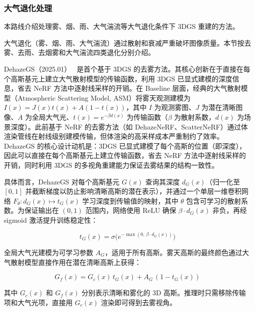 \subsubsection{大气退化处理}

本路线介绍处理雾、烟、雨、大气湍流等大气退化条件下 3DGS 重建的方法。

大气退化（雾、烟、雨、大气湍流）通过散射和衰减严重破坏图像质量。本节按去雾、去雨、去烟雾和大气湍流四类退化分别介绍。

DehazeGS（2025.01）~\cite{2501_03659} 是首个基于 3DGS 的去雾方法。其核心创新在于直接在每个高斯基元上建立大气散射模型的传输函数，利用 3DGS 已显式建模的深度信息，省去 NeRF 方法中逐射线采样的开销。在 Baseline 层面，经典的大气散射模型（Atmospheric Scattering Model, ASM）将雾天观测建模为 $I(x) = J(x)t(x) + A(1-t(x))$，其中 $I$ 为观测雾图、$J$ 为潜在清晰图像、$A$ 为全局大气光、$t(x) = e^{-\beta d(x)}$ 为传输函数（$\beta$ 为散射系数，$d(x)$ 为场景深度）。此前基于 NeRF 的去雾方法（如 DehazeNeRF、ScatterNeRF）通过体渲染管线在射线级别建模传输，但体渲染的高采样成本严重制约了效率。DehazeGS 的核心设计动机是：3DGS 已显式建模了每个高斯的位置（即深度），因此可以直接在每个高斯基元上建立传输函数，省去 NeRF 方法中逐射线采样的开销，同时利用 3DGS 的多视角重建能力保证去雾结果的结构一致性。

具体而言，DehazeGS 对每个高斯基元 $G(x)$ 查询其深度 $d_G(x)$（归一化至 $[0,1]$ 并截断梯度以防止影响清晰高斯的潜在表示），并通过一个单层一维卷积网络 $F_\theta: d_G(x) \mapsto t_G(x)$ 学习深度到传输值的映射，其中 $\theta$ 包含可学习的散射系数。为保证输出在 $(0,1)$ 范围内，网络使用 ReLU 确保 $\beta \cdot d_G(x)$ 非负，再经 sigmoid 激活提升训练稳定性：

\begin{equation}
t_G(x) = \sigma\!\bigl(e^{-\max(0,\, \beta \cdot d_G(x))}\bigr)
\end{equation}

全局大气光建模为可学习参数 $A_G$，适用于所有高斯。雾天高斯的最终颜色通过大气散射模型直接作用在潜在清晰高斯上获得：

\begin{equation}
G_f(x) = G_c(x)\,t_G(x) + A_G\,(1 - t_G(x))
\end{equation}

其中 $G_c(x)$ 和 $G_f(x)$ 分别表示清晰和雾化的 3D 高斯。推理时只需移除传输项和大气光项，直接用 $G_c(x)$ 渲染即可得到去雾视角。

